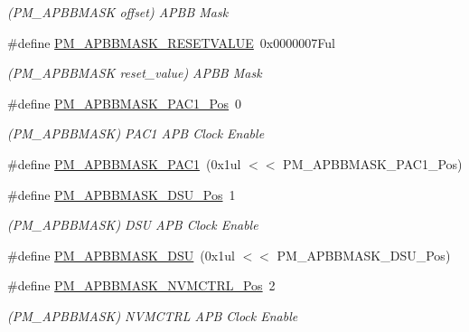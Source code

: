 \begin{DoxyCompactItemize}
\begin{DoxyCompactList}\small\item\em (P\+M\+\_\+\+A\+P\+B\+B\+M\+A\+SK offset) A\+P\+BB Mask \end{DoxyCompactList}\item 
\#define \mbox{\hyperlink{group___s_a_m_d21___p_m_ga907a31009679084d15277e9207f830fe}{P\+M\+\_\+\+A\+P\+B\+B\+M\+A\+S\+K\+\_\+\+R\+E\+S\+E\+T\+V\+A\+L\+UE}}~0x0000007\+Ful
\begin{DoxyCompactList}\small\item\em (P\+M\+\_\+\+A\+P\+B\+B\+M\+A\+SK reset\+\_\+value) A\+P\+BB Mask \end{DoxyCompactList}\item 
\#define \mbox{\hyperlink{group___s_a_m_d21___p_m_ga6be40aecf3f215cda5582bf370c57957}{P\+M\+\_\+\+A\+P\+B\+B\+M\+A\+S\+K\+\_\+\+P\+A\+C1\+\_\+\+Pos}}~0
\begin{DoxyCompactList}\small\item\em (P\+M\+\_\+\+A\+P\+B\+B\+M\+A\+SK) P\+A\+C1 A\+PB Clock Enable \end{DoxyCompactList}\item 
\#define \mbox{\hyperlink{group___s_a_m_d21___p_m_ga28e25c1f55bde9a96b2de5562d04328d}{P\+M\+\_\+\+A\+P\+B\+B\+M\+A\+S\+K\+\_\+\+P\+A\+C1}}~(0x1ul $<$$<$ P\+M\+\_\+\+A\+P\+B\+B\+M\+A\+S\+K\+\_\+\+P\+A\+C1\+\_\+\+Pos)
\item 
\#define \mbox{\hyperlink{group___s_a_m_d21___p_m_ga2e04e1241cbf44a024498798d4116273}{P\+M\+\_\+\+A\+P\+B\+B\+M\+A\+S\+K\+\_\+\+D\+S\+U\+\_\+\+Pos}}~1
\begin{DoxyCompactList}\small\item\em (P\+M\+\_\+\+A\+P\+B\+B\+M\+A\+SK) D\+SU A\+PB Clock Enable \end{DoxyCompactList}\item 
\#define \mbox{\hyperlink{group___s_a_m_d21___p_m_ga9f104b5736f8f59e2dbce736333cca6e}{P\+M\+\_\+\+A\+P\+B\+B\+M\+A\+S\+K\+\_\+\+D\+SU}}~(0x1ul $<$$<$ P\+M\+\_\+\+A\+P\+B\+B\+M\+A\+S\+K\+\_\+\+D\+S\+U\+\_\+\+Pos)
\item 
\#define \mbox{\hyperlink{group___s_a_m_d21___p_m_gaec009e67d67461d158071c23dc16f8e7}{P\+M\+\_\+\+A\+P\+B\+B\+M\+A\+S\+K\+\_\+\+N\+V\+M\+C\+T\+R\+L\+\_\+\+Pos}}~2
\begin{DoxyCompactList}\small\item\em (P\+M\+\_\+\+A\+P\+B\+B\+M\+A\+SK) N\+V\+M\+C\+T\+RL A\+PB Clock Enable \end{DoxyCompactList}\item 

\end{DoxyCompactItemize}
